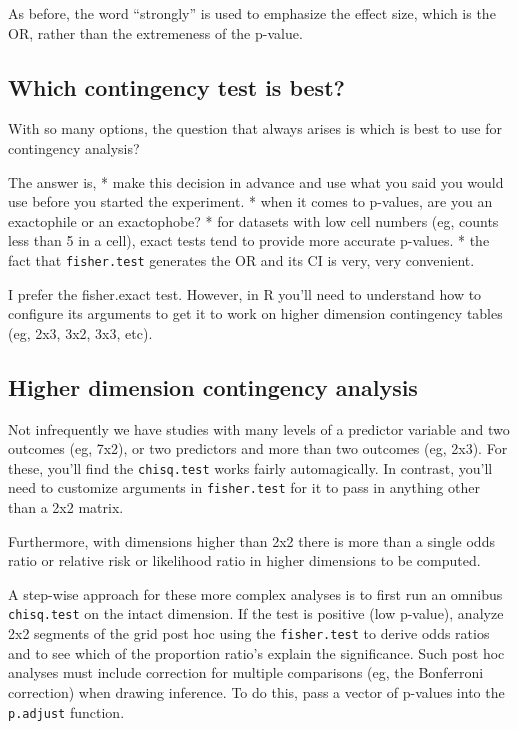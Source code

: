 \documentclass[]{book}
\begin{document}
As before, the word ``strongly'' is used to emphasize the effect size, which is the OR, rather than the extremeness of the p-value.

\hypertarget{which-contingency-test-is-best}{%
\subsection{Which contingency test is best?}\label{which-contingency-test-is-best}}

With so many options, the question that always arises is which is best to use for contingency analysis?

The answer is,
* make this decision in advance and use what you said you would use before you started the experiment.
* when it comes to p-values, are you an exactophile or an exactophobe?
* for datasets with low cell numbers (eg, counts less than 5 in a cell), exact tests tend to provide more accurate p-values.
* the fact that \texttt{fisher.test} generates the OR and its CI is very, very convenient.

I prefer the fisher.exact test. However, in R you'll need to understand how to configure its arguments to get it to work on higher dimension contingency tables (eg, 2x3, 3x2, 3x3, etc).

\hypertarget{higher-dimension-contingency-analysis}{%
\subsection{Higher dimension contingency analysis}\label{higher-dimension-contingency-analysis}}

Not infrequently we have studies with many levels of a predictor variable and two outcomes (eg, 7x2), or two predictors and more than two outcomes (eg, 2x3). For these, you'll find the \texttt{chisq.test} works fairly automagically. In contrast, you'll need to customize arguments in \texttt{fisher.test} for it to pass in anything other than a 2x2 matrix.

Furthermore, with dimensions higher than 2x2 there is more than a single odds ratio or relative risk or likelihood ratio in higher dimensions to be computed.

A step-wise approach for these more complex analyses is to first run an omnibus \texttt{chisq.test} on the intact dimension. If the test is positive (low p-value), analyze 2x2 segments of the grid post hoc using the \texttt{fisher.test} to derive odds ratios and to see which of the proportion ratio's explain the significance. Such post hoc analyses must include correction for multiple comparisons (eg, the Bonferroni correction) when drawing inference. To do this, pass a vector of p-values into the \texttt{p.adjust} function.
\end{document}
